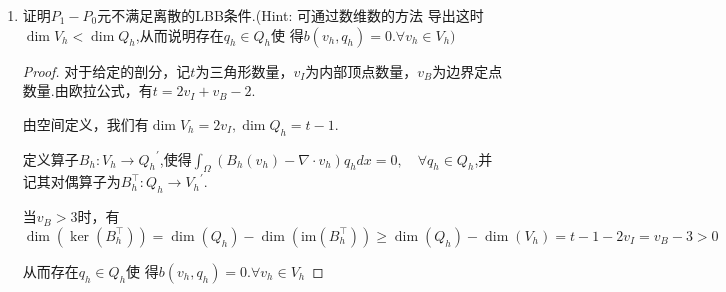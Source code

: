 \documentclass[12pt,a4paper]{article}
\begin{document}
\begin{enumerate}
\begin{proof}
			\begin{equation*}
				\begin{aligned}\left\|\widehat{v}-\Pi_{\widehat{h}}\widehat{v}\right\|_{i,p,\widehat{K}}&\leq\left\|\widehat{v}-\Pi_{\widehat{h}}\widehat{v}\right\|_{m,p,\widehat{K}}\quad(\text{参考单元上范数等价})\\&\leq\left\|\widehat{v}-P_{m-1}\widehat{v}\right\|+\left\|P_{m-1}\widehat{v}-\Pi_{\widehat{h}}\widehat{v}\right\|_{m,p,\widehat{K}}\\&=\left\|\widehat{v}-P_{m-1}\widehat{v}\right\|+\left\|\Pi_{\widehat{h}}(P_{m-1}\widehat{v}-\widehat{v})\right\|_{m,p,\widehat{K}}\\&\leq(1+\sigma(\widehat{K}))C(m,n,\widehat{\gamma})\left|\widehat{v}\right|_{m,p,\widehat{K}}\\&\leq(1+\sigma(\widehat{K}))C(m,n,\widehat{\gamma})\left\|B\right\|^{m}|\det B|^{-1/p}|v|_{m,p,K}\end{aligned}
			\end{equation*}
			
			再结合网格正则性得到插值误差估计.
		\end{proof}
		\item 证明$P_1-P_0$元不满足离散的LBB条件.(Hint: 可通过数维数的方法
		导出这时$\dim V_h < \dim Q_h$,从而说明存在$q_h\in Q_h$使
		得$b(v_h,q_h)=0.\forall v_h\in V_h)$	
		
		\begin{proof}
			对于给定的剖分，记$t$为三角形数量，$v_I$为内部顶点数量，$v_B$为边界定点数量.由欧拉公式，有$t=2v_I+v_B-2$.
			
			由空间定义，我们有$\dim V_h = 2 v_I, \dim Q_h = t-1$.
			
			定义算子$B_h:V_h\rightarrow {Q_h}^\prime$,使得$\int_{\Omega}(B_h({v}_h)-\nabla\cdot{v}_h)q_h {d}x=0, \quad \forall q_h \in Q_h$,并记其对偶算子为$B_h^\top:Q_h \rightarrow {V_h}^\prime$.
			
			当$v_B > 3$时，有
			$$\dim(\ker(B_h^\top)) =\dim(Q_{h})-\dim(\mathrm{im}(B_{h}^{\top}))\geq\dim(Q_{h})-\dim(V_{h})=t-1-2v_I=v_B-3>0$$
			
			从而存在$q_h\in Q_h$使
			得$b(v_h,q_h)=0.\forall v_h\in V_h$	
		\end{proof}
		
	\end{enumerate}
	
	
\end{document}
